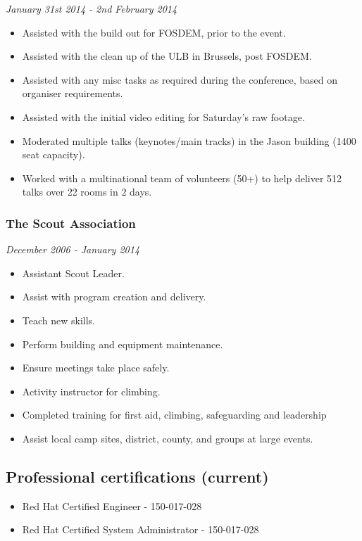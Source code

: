 \emph{January 31st 2014 - 2nd February 2014}

\begin{itemize}
\tightlist
\item
  Assisted with the build out for FOSDEM, prior to the event.
\item
  Assisted with the clean up of the ULB in Brussels, post FOSDEM.
\item
  Assisted with any misc tasks as required during the conference, based
  on organiser requirements.
\item
  Assisted with the initial video editing for Saturday's raw footage.
\item
  Moderated multiple talks (keynotes/main tracks) in the Jason building
  (1400 seat capacity).
\item
  Worked with a multinational team of volunteers (50+) to help deliver
  512 talks over 22 rooms in 2 days.
\end{itemize}

\subsubsection{The Scout Association}\label{the-scout-association}

\emph{December 2006 - January 2014}

\begin{itemize}
\tightlist
\item
  Assistant Scout Leader.
\item
  Assist with program creation and delivery.
\item
  Teach new skills.
\item
  Perform building and equipment maintenance.
\item
  Ensure meetings take place safely.
\item
  Activity instructor for climbing.
\item
  Completed training for first aid, climbing, safeguarding and
  leadership
\item
  Assist local camp sites, district, county, and groups at large events.
\end{itemize}

\subsection{Professional certifications
(current)}\label{professional-certifications-current}

\begin{itemize}
\tightlist
\item
  Red Hat Certified Engineer - 150-017-028
\item
  Red Hat Certified System Administrator - 150-017-028
\end{itemize}


